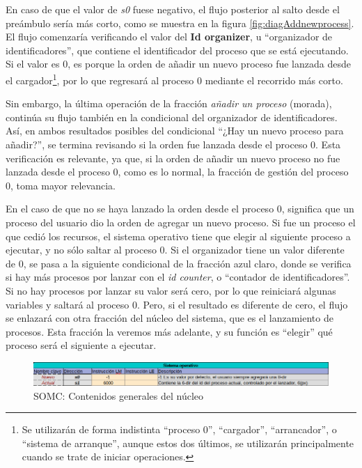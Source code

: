 \documentclass[letterpaper,12pt,oneside]{book}
\begin{document}
			En caso de que el valor de \textit{s0} fuese negativo, el flujo posterior al salto desde el preámbulo sería más corto,
			como se muestra en la figura \ref{fig:diagAddnewprocess}. El flujo comenzaría verificando el 
			valor del \textbf{Id organizer}, u ``organizador de identificadores'', que contiene el identificador del proceso que se está ejecutando. Si 
			el 
			valor es 0, es porque 
            la orden de añadir un nuevo proceso fue lanzada desde el cargador\footnote{Se utilizarán de forma indistinta ``proceso 0'', ``cargador'', 
            ``arrancador'', o 
            ``sistema de arranque'', aunque estos dos últimos, se utilizarán principalmente cuando se trate de iniciar operaciones.}, por lo que regresará 
            al proceso 0 mediante el recorrido más corto.
  
       
            Sin embargo, la última operación de la fracción \textit{añadir un proceso} (morada), continúa su flujo también en la condicional
            del organizador de identificadores. Así, en ambos resultados posibles del condicional ``¿Hay un nuevo proceso para añadir?'', 
			se termina revisando si la orden fue 
			lanzada desde el proceso 0. Esta verificación es relevante, ya que, si la orden de añadir un nuevo proceso no fue lanzada desde el proceso 
			0, como es lo normal, la fracción de gestión del proceso 0, toma mayor relevancia. 
			
			En el caso de 
			que no se haya lanzado la 
			orden
			desde el proceso 0, significa que un proceso del usuario dio la orden
   			de agregar un nuevo proceso. Si fue un proceso el que cedió los recursos, el sistema operativo tiene que elegir al siguiente 
   			proceso a ejecutar, y no sólo saltar al proceso 0. Si el organizador tiene un valor diferente de 0, se pasa a la siguiente
   			condicional de la fracción azul claro, donde se verifica si hay más procesos por lanzar con el \textit{id counter}, o ``contador
   			de identificadores''. Si no hay procesos por lanzar su valor será cero, por lo que reiniciará algunas variables  y saltará al proceso 0.
   			Pero,
   			si el resultado es diferente de cero, el flujo se enlazará con otra fracción del núcleo del sistema, que es el lanzamiento de procesos. Esta 
   			fracción la veremos
			más adelante, y su función  es ``elegir'' qué proceso será el siguiente a ejecutar.

			 \begin{figure}[H]		
				\centering
				\includegraphics[scale=0.55]{media/CARDIACC/SOMCGeneralNucleo.png}
				\caption{SOMC: Contenidos generales del núcleo}
				\label{fig:somcGeneralnucleo}
			\end{figure}
  
\end{document}
